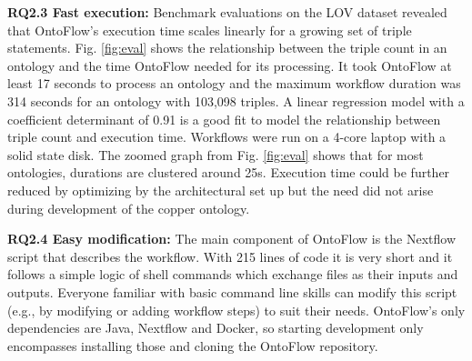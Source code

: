 \documentclass[runningheads]{llncs}
\begin{document}
\noindent\textbf{RQ2.3 Fast execution:} Benchmark evaluations on the LOV dataset revealed that OntoFlow's execution time scales linearly for a growing set of triple statements. Fig. \ref{fig:eval} shows the relationship between the triple count in an ontology and the time OntoFlow needed for its processing. It took OntoFlow at least 17 seconds to process an ontology and the maximum workflow duration was 314 seconds for an ontology with 103,098 triples. A linear regression model with a coefficient determinant of 0.91 is a good fit to model the relationship between triple count and execution time. Workflows were run on a 4-core laptop with a solid state disk. The zoomed graph from Fig. \ref{fig:eval} shows that for most ontologies, durations are clustered around 25s. Execution time could be further reduced by optimizing by the architectural set up but the need did not arise during development of the copper ontology.

\noindent\textbf{RQ2.4 Easy modification:} The main component of OntoFlow is the Nextflow script that describes the workflow. With 215 lines of code it is very short and it follows a simple logic of shell commands which exchange files as their inputs and outputs. Everyone familiar with basic command line skills can modify this script (e.g., by modifying or adding workflow steps) to suit their needs. OntoFlow's only dependencies are Java, Nextflow and Docker, so starting development only encompasses installing those and cloning the OntoFlow repository.
\end{document}
